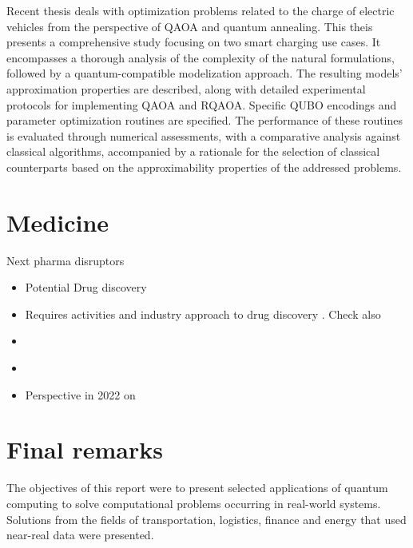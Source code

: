 \documentclass[a4paper,11pt]{article}
\begin{document}
Recent thesis \cite{veshchezerova2022quantum} deals with optimization problems related to the charge of electric vehicles from the perspective of QAOA and quantum annealing. This theis presents a comprehensive study focusing on two smart charging use cases. It encompasses a thorough analysis of the complexity of the natural formulations, followed by a quantum-compatible modelization approach. The resulting models' approximation properties are described, along with detailed experimental protocols for implementing QAOA and RQAOA. Specific QUBO encodings and parameter optimization routines are specified. The performance of these routines is evaluated through numerical assessments, with a comparative analysis against classical algorithms, accompanied by a rationale for the selection of classical counterparts based on the approximability properties of the addressed problems.



\section{Medicine}
%

Next pharma disruptors \cite{cova2021artificial}

\begin{itemize}
\item Potential Drug discovery \cite{cao2018potential}
\item Requires activities and industry approach to drug discovery \cite{zinner2022institutionalization}. Check also \cite{zinner2021quantum}
\item  \cite{floether2023state}
%
\item \cite{cordier2022biology}

\item Perspective in 2022 on \cite{blunt2022perspective}
\end{itemize}
\section{Final remarks}

The objectives of this report were to present selected applications of quantum computing to solve computational problems occurring in real-world systems. Solutions from the fields of transportation, logistics, finance and energy that used near-real data were presented.
\end{document}
